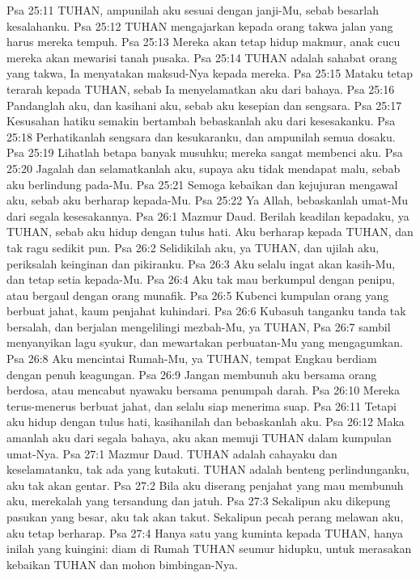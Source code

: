 Psa 25:11  TUHAN, ampunilah aku sesuai dengan janji-Mu, sebab besarlah kesalahanku.
Psa 25:12  TUHAN mengajarkan kepada orang takwa jalan yang harus mereka tempuh.
Psa 25:13  Mereka akan tetap hidup makmur, anak cucu mereka akan mewarisi tanah pusaka.
Psa 25:14  TUHAN adalah sahabat orang yang takwa, Ia menyatakan maksud-Nya kepada mereka.
Psa 25:15  Mataku tetap terarah kepada TUHAN, sebab Ia menyelamatkan aku dari bahaya.
Psa 25:16  Pandanglah aku, dan kasihani aku, sebab aku kesepian dan sengsara.
Psa 25:17  Kesusahan hatiku semakin bertambah bebaskanlah aku dari kesesakanku.
Psa 25:18  Perhatikanlah sengsara dan kesukaranku, dan ampunilah semua dosaku.
Psa 25:19  Lihatlah betapa banyak musuhku; mereka sangat membenci aku.
Psa 25:20  Jagalah dan selamatkanlah aku, supaya aku tidak mendapat malu, sebab aku berlindung pada-Mu.
Psa 25:21  Semoga kebaikan dan kejujuran mengawal aku, sebab aku berharap kepada-Mu.
Psa 25:22  Ya Allah, bebaskanlah umat-Mu dari segala kesesakannya.
Psa 26:1  Mazmur Daud. Berilah keadilan kepadaku, ya TUHAN, sebab aku hidup dengan tulus hati. Aku berharap kepada TUHAN, dan tak ragu sedikit pun.
Psa 26:2  Selidikilah aku, ya TUHAN, dan ujilah aku, periksalah keinginan dan pikiranku.
Psa 26:3  Aku selalu ingat akan kasih-Mu, dan tetap setia kepada-Mu.
Psa 26:4  Aku tak mau berkumpul dengan penipu, atau bergaul dengan orang munafik.
Psa 26:5  Kubenci kumpulan orang yang berbuat jahat, kaum penjahat kuhindari.
Psa 26:6  Kubasuh tanganku tanda tak bersalah, dan berjalan mengelilingi mezbah-Mu, ya TUHAN,
Psa 26:7  sambil menyanyikan lagu syukur, dan mewartakan perbuatan-Mu yang mengagumkan.
Psa 26:8  Aku mencintai Rumah-Mu, ya TUHAN, tempat Engkau berdiam dengan penuh keagungan.
Psa 26:9  Jangan membunuh aku bersama orang berdosa, atau mencabut nyawaku bersama penumpah darah.
Psa 26:10  Mereka terus-menerus berbuat jahat, dan selalu siap menerima suap.
Psa 26:11  Tetapi aku hidup dengan tulus hati, kasihanilah dan bebaskanlah aku.
Psa 26:12  Maka amanlah aku dari segala bahaya, aku akan memuji TUHAN dalam kumpulan umat-Nya.
Psa 27:1  Mazmur Daud. TUHAN adalah cahayaku dan keselamatanku, tak ada yang kutakuti. TUHAN adalah benteng perlindunganku, aku tak akan gentar.
Psa 27:2  Bila aku diserang penjahat yang mau membunuh aku, merekalah yang tersandung dan jatuh.
Psa 27:3  Sekalipun aku dikepung pasukan yang besar, aku tak akan takut. Sekalipun pecah perang melawan aku, aku tetap berharap.
Psa 27:4  Hanya satu yang kuminta kepada TUHAN, hanya inilah yang kuingini: diam di Rumah TUHAN seumur hidupku, untuk merasakan kebaikan TUHAN dan mohon bimbingan-Nya.
